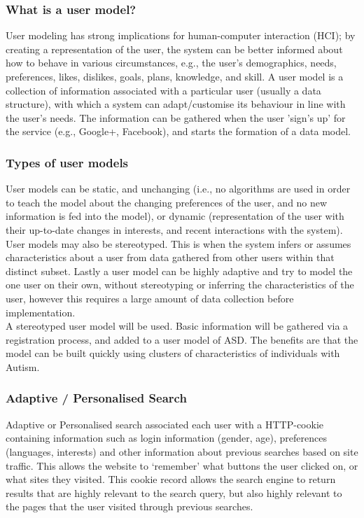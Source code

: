 \documentclass[10pt]{article}
\begin{document}
\subsubsection{What is a user model?}
User modeling has strong implications for human-computer interaction (HCI); by creating a representation of the user, the system can be better informed about how to behave in various circumstances, e.g., the user’s demographics, needs, preferences, likes, dislikes, goals, plans, knowledge, and skill. A user model is a collection of information associated with a particular user (usually a data structure), with which a system can adapt/customise its behaviour in line with the user’s needs. The information can be gathered when the user 'sign's up' for the service (e.g., Google+, Facebook), and starts the formation of a data model. \\

\subsubsection{Types of user models}
User models can be static, and unchanging (i.e., no algorithms are used in order to teach the model about the changing preferences of the user, and no new information is fed into the model), or dynamic (representation of the user with their up-to-date changes in interests, and recent interactions with the system). User models may also be stereotyped. This is when the system infers or assumes characteristics about a user from data gathered from other users within that distinct subset. Lastly a user model can be highly adaptive and try to model the one user on their own, without stereotyping or inferring the characteristics of the user, however this requires a large amount of data collection before implementation.\\
A stereotyped user model will be used. Basic information will be gathered via a registration process, and added to a user model of ASD. The benefits are that the model can be built quickly using clusters of characteristics of individuals with Autism.

\subsubsection{Adaptive / Personalised Search}
Adaptive or Personalised search associated each user with a HTTP-cookie containing information such as login information (gender, age), preferences (languages, interests) and other information about previous searches based on site traffic. This allows the website to ‘remember’ what buttons the user clicked on, or what sites they visited. This cookie record allows the search engine to return results that are highly relevant to the search query, but also highly relevant to the pages that the user visited through previous searches. 
\end{document}
